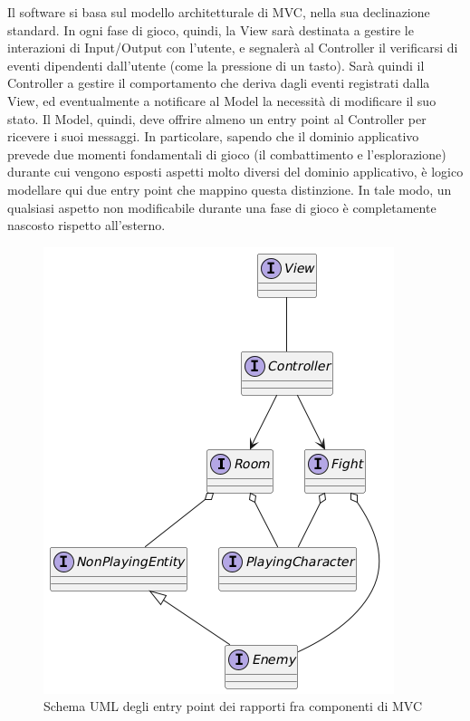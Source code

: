 \documentclass[a4paper,12pt]{report}
\begin{document}
Il software si basa sul modello architetturale di MVC, nella sua declinazione standard. In ogni fase
di gioco, quindi, la View sarà destinata a gestire le interazioni di Input/Output con l'utente, e segnalerà al
Controller il verificarsi di eventi dipendenti dall'utente (come la pressione di un tasto). Sarà quindi il Controller
a gestire il comportamento che deriva dagli eventi registrati dalla View, ed eventualmente a notificare al Model la
necessità di modificare il suo stato.
\newline Il Model, quindi, deve offrire almeno un entry point al Controller per ricevere i suoi messaggi. In particolare,
sapendo che il dominio applicativo prevede due momenti fondamentali di gioco (il combattimento e l'esplorazione) durante
cui vengono esposti aspetti molto diversi del dominio applicativo, è logico modellare qui due entry point che mappino
questa distinzione. In tale modo, un qualsiasi aspetto non modificabile durante una fase di gioco è completamente
nascosto rispetto all'esterno. 

\begin{figure}[H]
	\centering{}
	\includegraphics[width=\textwidth]{img/entryPoints.png}
	\caption{Schema UML degli entry point dei rapporti fra componenti di MVC}
	\label{img:entryPoints}
\end{figure}
\end{document}
